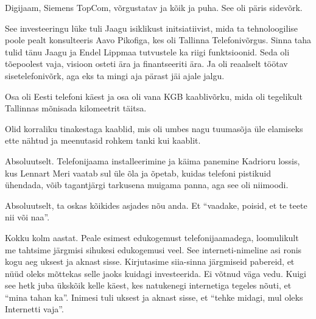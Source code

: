 Digijaam, Siemens TopCom,  võrgustatav ja kõik ja puha. See  oli päris sidevõrk.


See investeeringu lüke tuli Jaagu isiklikust initsiatiivist, mida ta  
tehnoloogilise poole pealt konsulteeris Aavo Pikofiga, 
kes oli Tallinna Telefonivõrgus. Sinna taha tulid tänu Jaagu ja Endel 
Lippmaa tutvustele ka riigi funktsioonid. Seda oli 
tõepoolest vaja, visioon osteti ära ja finantseeriti ära. Ja oli reaalselt 
töötav sisetelefonivõrk, aga eks ta mingi aja pärast jäi ajale jalgu.


Osa oli Eesti telefoni käest ja osa oli vana KGB kaablivõrku, mida oli 
tegelikult Tallinnas mõnisada kilomeetrit täitsa.


Olid korraliku tinakestaga kaablid, mis oli umbes nagu tuumasõja üle elamiseks 
ette nähtud ja meenutasid rohkem tanki kui kaablit.


Absoluutselt. Telefonijaama installeerimine ja käima panemine Kadrioru lossis, 
kus Lennart Meri vaatab sul üle õla ja õpetab, kuidas 
telefoni pistikuid ühendada, võib tagantjärgi tarkusena muigama panna, aga see 
oli niimoodi. 


Absoluutselt, ta oskas kõikides asjades nõu anda. Et \enquote{vaadake, poisid, 
et te teete nii või naa}.


Kokku kolm aastat. Peale esimest edukogemust telefonijaamadega, loomulikult me 
tahtsime järgmisi sihukesi edukogemusi veel. See interneti-nimeline asi ronis 
kogu aeg uksest ja aknast sisse. Kirjutasime siia-sinna järgmiseid pabereid, et 
nüüd oleks mõttekas selle jaoks kuidagi investeerida. Ei võtnud väga vedu. 
Kuigi see hetk juba ükskõik kelle käest, kes natukenegi internetiga tegeles 
nõuti, et \enquote{mina tahan ka}. Inimesi tuli uksest ja aknast sisse, et 
\enquote{tehke midagi, mul oleks Internetti vaja}. 

